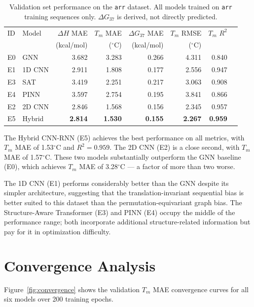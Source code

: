 \documentclass[12pt,oneside,letterpaper]{report}
\begin{document}
\begin{table}[h!]
\centering
\caption{Validation set performance on the \texttt{arr} dataset. All models trained on \texttt{arr} training sequences only. $\Delta G_{37}$ is derived, not directly predicted.}
\label{tab:results_main}
\begin{tabular}{llrrrrrr}
\toprule
ID & Model & $\Delta H$ MAE & $T_m$ MAE & $\Delta G_{37}$ MAE & $T_m$ RMSE & $T_m$ $R^2$ \\
   &       & (kcal/mol) & ($^\circ$C) & (kcal/mol) & ($^\circ$C) & \\
\midrule
E0 & GNN   & 3.682 & 3.283 & 0.266 & 4.311 & 0.840 \\
E1 & 1D CNN & 2.911 & 1.808 & 0.177 & 2.556 & 0.947 \\
E3 & SAT   & 3.419 & 2.251 & 0.217 & 3.063 & 0.908 \\
E4 & PINN  & 3.597 & 2.754 & 0.195 & 3.841 & 0.866 \\
E2 & 2D CNN & 2.846 & 1.568 & 0.156 & 2.345 & 0.957 \\
E5 & Hybrid & \textbf{2.814} & \textbf{1.530} & \textbf{0.155} & \textbf{2.267} & \textbf{0.959} \\
\bottomrule
\end{tabular}
\end{table}

The Hybrid CNN-RNN (E5) achieves the best performance on all metrics, with $T_m$ MAE of 1.53$^\circ$C and $R^2 = 0.959$. The 2D CNN (E2) is a close second, with $T_m$ MAE of 1.57$^\circ$C. These two models substantially outperform the GNN baseline (E0), which achieves $T_m$ MAE of 3.28$^\circ$C --- a factor of more than two worse.

The 1D CNN (E1) performs considerably better than the GNN despite its simpler architecture, suggesting that the translation-invariant sequential bias is better suited to this dataset than the permutation-equivariant graph bias. The Structure-Aware Transformer (E3) and PINN (E4) occupy the middle of the performance range; both incorporate additional structure-related information but pay for it in optimization difficulty.

\section{Convergence Analysis}

Figure~\ref{fig:convergence} shows the validation $T_m$ MAE convergence curves for all six models over 200 training epochs.
\end{document}
